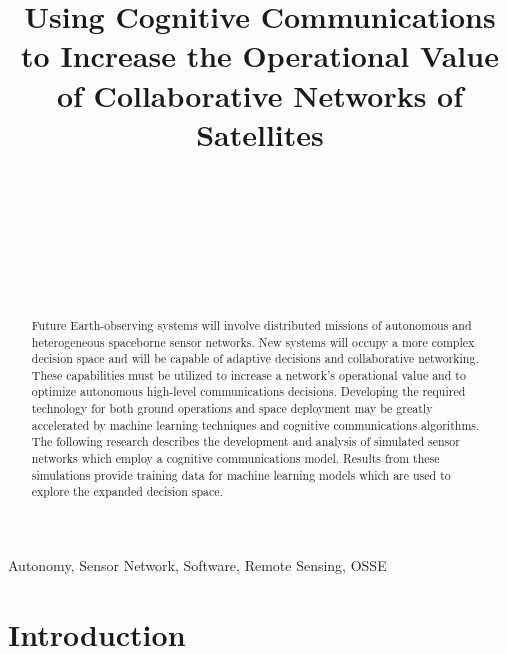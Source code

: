 \documentclass[conference]{IEEEtran}
\title{Using Cognitive Communications to Increase the Operational Value of
  Collaborative Networks of Satellites}
\author{
  \IEEEauthorblockN{Ryan B. Linnabary}
  \IEEEauthorblockA{\thisplace linnabary.24@osu.edu}
  \and
  \IEEEauthorblockN{Andrew J. O'Brien}
  \IEEEauthorblockA{\thisplace obrien.200@osu.edu}
  \and
  \IEEEauthorblockN{Graeme E. Smith}
  \IEEEauthorblockA{\thisplace smith.8347@osu.edu}
  \and
  \IEEEauthorblockN{Christopher Ball}
  \IEEEauthorblockA{\thisplace ball.51@osu.edu}
  \and {~} \and {~~~~~~~~~~~~~~~~} \and
  \IEEEauthorblockN{Joel T. Johnson}
  \IEEEauthorblockA{\thisplace johnson.1374@osu.edu}
  \and {~~~~~~} \and {~~~~~~}
}
\begin{document}
\maketitle



\begin{abstract}
  Future Earth-observing systems will involve distributed missions of autonomous
and heterogeneous spaceborne sensor networks.  New systems will occupy a more
complex decision space and will be capable of adaptive decisions and
collaborative networking.  These capabilities must be utilized to increase a
network's operational value and to optimize autonomous high-level communications
decisions.  Developing the required technology for both ground operations and
space deployment may be greatly accelerated by machine learning techniques and
cognitive communications algorithms.  The following research describes the
development and analysis of simulated sensor networks which employ a cognitive
communications model.  Results from these simulations provide training data for
machine learning models which are used to explore the expanded decision space.
\end{abstract}

\begin{IEEEkeywords}
  Autonomy, Sensor Network, Software, Remote Sensing, OSSE
\end{IEEEkeywords}


\section{Introduction}
\label{sec:intro}
\end{document}
